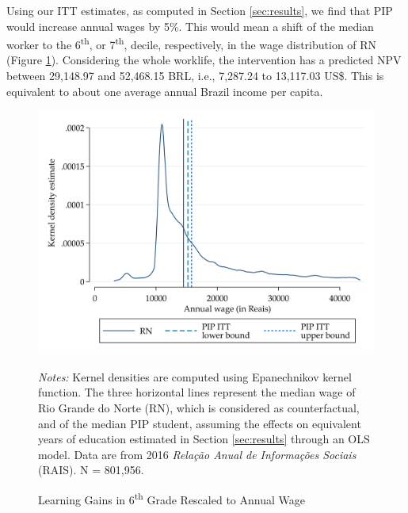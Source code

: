 \documentclass[11pt,a4paper]{article}
\begin{document}
Using our ITT estimates, as computed in Section \ref{sec:results}, we find that PIP would increase annual wages by 5\%. This would mean a shift of the median worker to the 6\textsuperscript{th}, or 7\textsuperscript{th}, decile, respectively, in the wage distribution of RN (Figure \ref{fig:kdensity_wage}). Considering the whole worklife, the intervention has a predicted NPV between 29,148.97 and 52,468.15 BRL, i.e., 7,287.24 to 13,117.03 US\$. This is equivalent to about one average annual Brazil income per capita.

\vspace{3em}

\begin{figure}[ht!]
    \centering
    \caption{Learning Gains in 6\textsuperscript{th} Grade Rescaled to Annual Wage}
    \includegraphics[width=14cm]{DataWork/Output/Figures/figB1-kdensity_wage.png}
    \label{fig:kdensity_wage}
     
    \begin{minipage}{0.825\textwidth}
        \small{\textit{Notes:} Kernel densities are computed using Epanechnikov kernel function. The three horizontal lines represent the median wage of Rio Grande do Norte (RN), which is considered as counterfactual, and of the median PIP student, assuming the effects on equivalent years of education estimated in Section \ref{sec:results} through an OLS model. Data are from 2016 \textit{Relação Anual de Informações Sociais} (RAIS). N = 801,956.}
    \end{minipage}
\end{figure}
\end{document}
